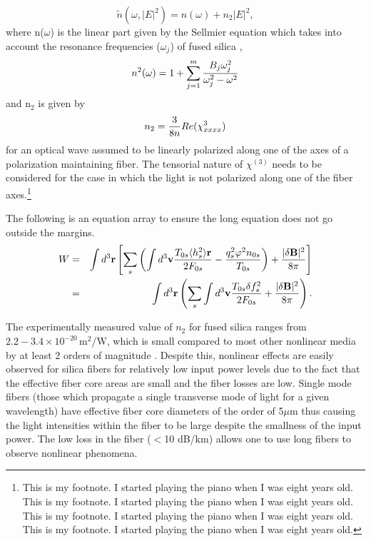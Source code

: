 \begin{equation}
\tilde{n}(\omega,|E|^2) = n(\omega)+n_2|E|^2 ,
\end{equation}
where n($\omega$) is the linear part given by the Sellmier
equation which
takes into account the resonance frequencies ($\omega_j$) of fused
silica \cite{Agrawal1,Marcuse},
\begin{equation}
n^2(\omega) = 1 + \sum_{j=1}^m {B_j\omega^2_j \over \omega^2_j - \omega^2}
\end{equation}
and n$_2$ is given by
\begin{equation}
n_2 = {3 \over 8n}Re(\chi_{xxxx}^3)
\end{equation}
for an optical wave assumed to be linearly polarized along one of the 
axes of a polarization maintaining fiber. The tensorial nature of $\chi^{(3)}$ needs to be
considered for the case in which the light is not polarized along one of
the fiber axes.\footnote{This is my footnote.  I started playing the piano when I was eight years old.  This is my footnote.  I started playing the piano when I was eight years old.  This is my footnote.  I started playing the piano when I was eight years old.  This is my footnote.  I started playing the piano when I was eight years old.}

The following is an equation array to ensure the long equation does not go outside the margins.
\begin{eqnarray}
W & = & \int d^3{\bf r} \left[ \sum_s \left( \int d^3{\bf v} {T_{0s} \langle h^2_s \rangle {\bf r} \over 2F_{0s}} - {q^2_s\varphi^2 n_{0s} \over T_{0s}} \right) + {|\delta {\bf B}|^2 \over 8 \pi} \right] \nonumber \\
& = & \int d^3{\bf r} \left( \sum_s \int d^3{\bf v} {T_{0s}\delta f^2_s \over 2F_{0s}} + {|\delta {\bf B}|^2 \over 8\pi} \right) .
\end{eqnarray} 

The experimentally measured value of $n_{2}$ for fused silica ranges from $2.2 - 3.4 \times
10^{-20}$\,m$^2$/W, which is small compared to most other nonlinear media by
at least 2 orders of magnitude \cite{Agrawal1}. Despite this, nonlinear effects are
easily observed for silica fibers for relatively low input power levels due
to the fact that the effective fiber core areas are small and the fiber losses are low. 
Single mode fibers (those which propagate a single transverse mode of light for a given 
wavelength) have effective fiber core diameters of the order of 5$\mu$m thus causing 
the light intensities within the fiber to be large despite the smallness of the input 
power. The low loss in the fiber ($<$10 dB/km) allows one to use long fibers to observe 
nonlinear phenomena.

